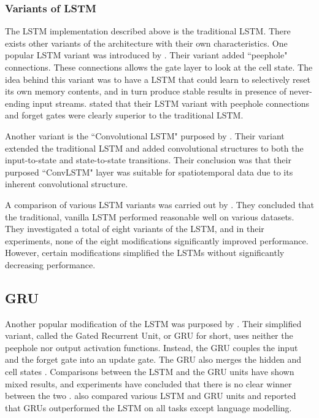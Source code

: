 \subsubsection{Variants of LSTM}
The LSTM implementation described above is the traditional LSTM. There exists other variants of the architecture with their own characteristics. One popular LSTM variant was introduced by \citep{gers2001lstm}. Their variant added ``peephole" connections. These connections allows the gate layer to look at the cell state. The idea behind this variant was to have a LSTM that could learn to selectively reset its own memory contents, and in turn produce stable results in presence of never-ending input streams. \citep{gers2001lstm} stated that their LSTM variant with peephole connections and forget gates were clearly superior to the traditional LSTM. 

Another variant is the ``Convolutional LSTM" purposed by \citep{xingjian2015convolutional}. Their variant extended the traditional LSTM and added convolutional structures to both the input-to-state and state-to-state transitions. Their conclusion was that their purposed ``ConvLSTM" layer was suitable for spatiotemporal data due to its inherent convolutional structure.

A comparison of various LSTM variants was carried out by \citep{greff2016lstm}. They concluded that the traditional, vanilla LSTM performed reasonable well on various datasets. They investigated a total of eight variants of the LSTM, and in their experiments, none of the eight modifications significantly improved performance. However, certain modifications simplified the LSTMs without significantly decreasing performance. 

\subsection{GRU}
Another popular modification of the LSTM was purposed by \citep{chung2014empirical}. Their simplified variant, called the Gated Recurrent Unit, or GRU for short, uses neither the peephole nor output activation functions. Instead, the GRU couples the input and the forget gate into an update gate. The GRU also merges the hidden and cell states  \citep{greff2016lstm, chung2014empirical}. Comparisons between the LSTM and the GRU units have shown mixed results, and experiments have concluded that there is no clear winner between the two \citep{greff2016lstm, chung2014empirical}. \citep{jozefowicz2015empirical} also compared various LSTM and GRU units and reported that GRUs outperformed the LSTM on all tasks except language modelling.

